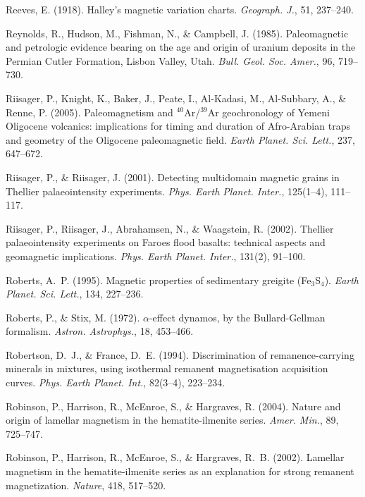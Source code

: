 \documentclass[,plain]{tauxe}
\begin{document}
\begin{thebibliography}{}
\bibitem{}%
Reeves, E. (1918).
Halley's magnetic variation charts.
{\it Geograph. J.}, 51, 237--240.

\bibitem{}%
Reynolds, R., Hudson, M., Fishman, N., \& Campbell, J. (1985).
Paleomagnetic and petrologic evidence bearing on the age and origin of uranium deposits in the Permian Cutler Formation, Lisbon Valley, Utah.
{\it Bull. Geol. Soc. Amer.}, 96, 719--730.

\bibitem{}%
Riisager, P., Knight, K., Baker, J., Peate, I., Al-Kadasi, M., Al-Subbary, A., \& Renne, P. (2005).
Paleomagnetism and $^{40}$Ar/$^{39}$Ar geochronology of Yemeni Oligocene volcanics: implications for timing and duration of Afro-Arabian traps and geometry of the Oligocene paleomagnetic field.
{\it Earth Planet. Sci. Lett.}, 237, 647--672.

\bibitem{}%
Riisager, P., \& Riisager, J. (2001).
Detecting multidomain magnetic grains in Thellier palaeointensity experiments.
{\it Phys. Earth Planet. Inter.}, 125(1--4), 111--117.

\bibitem{}%
Riisager, P., Riisager, J., Abrahamsen, N., \& Waagstein, R. (2002).
Thellier palaeointensity experiments on Faroes flood basalts: technical aspects and geomagnetic implications.
{\it Phys. Earth Planet. Inter.}, 131(2), 91--100.

\bibitem{}%
Roberts, A.~P. (1995).
Magnetic properties of sedimentary greigite (Fe$_3$S$_4$).
{\it Earth Planet. Sci. Lett.}, 134, 227--236.

\bibitem{}%
Roberts, P., \& Stix, M. (1972).
$\alpha$-effect dynamos, by the Bullard-Gellman formalism.
{\it Astron. Astrophys.}, 18, 453--466.

\bibitem{}%
Robertson, D.~J., \& France, D.~E. (1994).
Discrimination of remanence-carrying minerals in mixtures, using isothermal remanent magnetisation acquisition curves.
{\it Phys. Earth Planet. Int.}, 82(3--4), 223--234.

\bibitem{}%
Robinson, P., Harrison, R., McEnroe, S., \& Hargraves, R. (2004).
Nature and origin of lamellar magnetism in the hematite-ilmenite series.
{\it Amer. Min.}, 89, 725--747.

\bibitem{}%
Robinson, P., Harrison, R., McEnroe, S., \& Hargraves, R.~B. (2002).
Lamellar magnetism in the hematite-ilmenite series as an explanation for strong remanent magnetization.
{\it Nature}, 418, 517--520.


\end{thebibliography}
\end{document}
